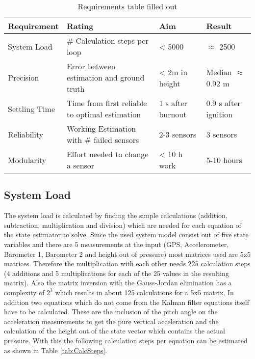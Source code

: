  \begin{table}[h]
 \centering
 \begin{tabular}{|l|l|l|l|}
 \hline
 \bf{Requirement}   & \bf{Rating} & \bf{Aim} & \bf{Result} \\ \hline
 System Load   & \# Calculation steps per loop & < 5000 & $\approx$ 2500 \\ \hline
 Precision     & Error between estimation and ground truth  & < 2m in height & Median $\approx$ 0.92 m  \\ \hline
 Settling Time & Time from first reliable to optimal estimation  & 1 s after burnout &  0.9 s after ignition\\ \hline
 Reliability   & Working Estimation with \# failed sensors & 2-3 sensors & 3 sensors \\ \hline
 Modularity    & Effort needed to change a sensor & < 10 h work &  5-10 hours \\ \hline
 \end{tabular}
 \caption{Requirements table filled out}
 \label{tab:RequirementsFilledOut}
 \end{table}


 \subsection{System Load}
 The system load is calculated by finding the simple calculations (addition, subtraction, multiplication and division) which are needed for each equation of the state estimator to solve.
 Since the used system model consist out of five state variables and there are 5 measurements at the input (GPS, Accelerometer, Barometer 1, Barometer 2 and height out of pressure) most matrices used are 5x5 matrices.
 Therefore the multiplication with each other needs 225 calculation steps (4 additions and 5 multiplications for each of the 25 values in the resulting matrix).
 Also the matrix inversion with the Gauss-Jordan elimination has a complexity of $2^3$ which results in about 125 calculations for a 5x5 matrix.
 In addition two equations which do not come from the Kalman filter equations itself have to be calculated.
 These are the inclusion of the pitch angle on the acceleration measurements to get the pure vertical acceleration and
 the calculation of the height out of the state vector which contains the actual pressure.
 With this the following calculation steps per equation can be estimated as shown in Table \ref{tab:CalcSteps}.

